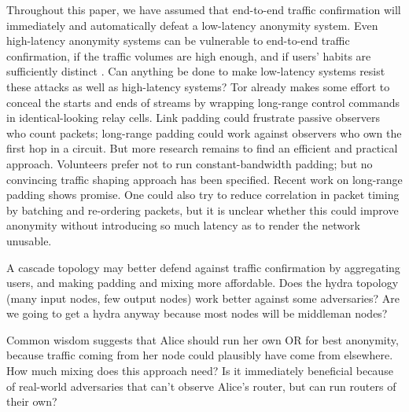 \documentclass[times,10pt,twocolumn]{article}
\begin{document}
Throughout this paper, we have assumed that end-to-end traffic
confirmation will immediately and automatically defeat a low-latency
anonymity system. Even high-latency anonymity systems can be
vulnerable to end-to-end traffic confirmation, if the traffic volumes
are high enough, and if users' habits are sufficiently distinct
\cite{limits-open,statistical-disclosure}. Can anything be done to
make low-latency systems resist these attacks as well as high-latency
systems? Tor already makes some effort to conceal the starts and ends of
streams by wrapping long-range control commands in identical-looking
relay cells. Link padding could frustrate passive observers who count
packets; long-range padding could work against observers who own the
first hop in a circuit. But more research remains to find an efficient
and practical approach. Volunteers prefer not to run constant-bandwidth
padding; but no convincing traffic shaping approach has been
specified. Recent work on long-range padding \cite{defensive-dropping}
shows promise. One could also try to reduce correlation in packet timing
by batching and re-ordering packets, but it is unclear whether this could
improve anonymity without introducing so much latency as to render the
network unusable.

A cascade topology may better defend against traffic confirmation by
aggregating users, and making padding and
mixing more affordable.  Does the hydra topology (many input nodes,
few output nodes) work better against some adversaries? Are we going
to get a hydra anyway because most nodes will be middleman nodes?

Common wisdom suggests that Alice should run her own OR for best
anonymity, because traffic coming from her node could plausibly have
come from elsewhere. How much mixing does this approach need?  Is it
immediately beneficial because of real-world adversaries that can't
observe Alice's router, but can run routers of their own?
\end{document}
